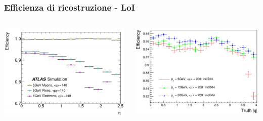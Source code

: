 \documentclass{beamer}
\begin{document}
\begin{frame}
\frametitle{Efficienza di ricostruzione - LoI}
\begin{columns}
\begin{column}{.5\textwidth}
\includegraphics[width=\textwidth]{eff_loi}
\end{column}
\begin{column}{.5\textwidth}
\includegraphics[width=\textwidth]{eff_abseta_pt}
\end{column}
\end{columns}

\end{frame}
\end{document}
